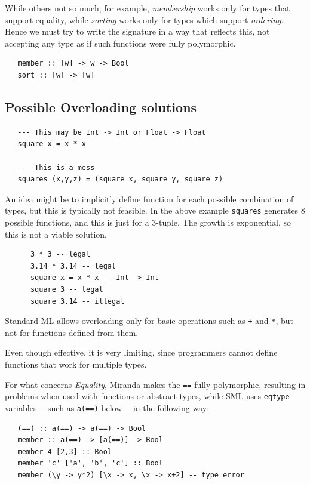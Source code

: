 While others not so much;
for example, \textit{membership} works only for types that support equality,
while \textit{sorting} works only for types which support \textit{ordering}. Hence we must try to write the signature in a way that reflects this, not accepting any type as if such functions were fully polymorphic.
\begin{lstlisting}
   member :: [w] -> w -> Bool
   sort :: [w] -> [w]
\end{lstlisting}

\subsection{Possible Overloading solutions}
\begin{lstlisting}
   --- This may be Int -> Int or Float -> Float
   square x = x * x

   --- This is a mess
   squares (x,y,z) = (square x, square y, square z)
\end{lstlisting}
An idea might be to implicitly define function for each possible combination of types, but this is typically not feasible.
In the above example \lstinline|squares| generates 8 possible functions, and this is just for a 3-tuple.
The growth is exponential, so this is not a viable solution.
\nl

\vspace{1em}
\begin{paracol}{2}
   
   \begin{lstlisting}
      3 * 3 -- legal
      3.14 * 3.14 -- legal
      square x = x * x -- Int -> Int
      square 3 -- legal
      square 3.14 -- illegal
   \end{lstlisting}
   \switchcolumn
   Standard ML allows overloading only for basic operations such as \lstinline|+| and \lstinline|*|, but not for functions defined from them.

   Even though effective, it is very limiting, since programmers cannot define functions that work for multiple types.
\end{paracol}
\nl

For what concerns \textit{Equality}, Miranda makes the \lstinline|==| fully polymorphic, resulting in problems when used with functions or abstract types, while SML uses  \lstinline|eqtype| variables ---such as \lstinline|a(==)| below--- in the following way:
\begin{lstlisting}
   (==) :: a(==) -> a(==) -> Bool
   member :: a(==) -> [a(==)] -> Bool
   member 4 [2,3] :: Bool
   member 'c' ['a', 'b', 'c'] :: Bool
   member (\y -> y*2) [\x -> x, \x -> x+2] -- type error
\end{lstlisting}


